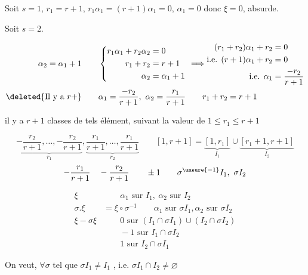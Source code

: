 Soit  $s=1$,  $r_1=r+1$, $r_1\alpha_1=(r+1)\alpha_1=0$, $\alpha_1=0$  donc $\xi=0$, absurde.

Soit $s=2$.

\[
\begin{aligned}
\alpha_2=\alpha_1+1\qquad&
\left\{\begin{aligned}
r_1\alpha_1+r_2\alpha_2&=0\\r_1+r_2&=r+1\\\alpha_2&=\alpha_1+1
\end{aligned}\right.
\ \Longrightarrow
\begin{aligned}
(r_1+r_2)\alpha_1+r_2&=0\\
\text{i.e. }(r+1)\alpha_1+r_2&=0\\
\text{i.e. }\alpha_1&=\frac{-r_2}{r+1}
\end{aligned}\\
\deleted{\text{Il y a }r+}\qquad&
\alpha_1=\frac{-r_2}{r+1},\ \alpha_2=\frac{r_1}{r+1}\qquad r_1+r_2=r+1
\end{aligned}
\]

il y a $r+1$ classes de tels élément, suivant la valeur de $1\leq r_1\leq r+1$


\[
\underbrace{-\frac{r_2}{r+1},\ldots,-\frac{r_2}{r+1}}_{r_1},
\underbrace{\frac{r_1}{r+1},\ldots,\frac{r_1}{r+1}}_{r_2}
\qquad
[1,r+1]=\underbrace{[1,r_1]}_{I_1}\cup\underbrace{[r_1+1,r+1]}_{I_2}
\]
\[-\frac{r_1}{r+1}\quad-\frac{r_2}{r+1}\qquad\pm1\qquad \sigma^{\unsure{-1}}I_1,\ \sigma I_2\]

\[
\begin{aligned}
\xi&\qquad\alpha_1\text{ sur }I_1,\ \alpha_2\text{ sur }I_2\\
\sigma.\xi&=\xi\circ\sigma^{-1}\qquad\alpha_1\text{ sur }\sigma I_1,\alpha_2\text{ sur }\sigma I_2\\
\xi-\sigma\xi&\qquad 0\text{ sur }(I_1\cap\sigma I_1)\cup(I_2\cap\sigma I_2)\\
&\qquad-1\text{ sur }I_1\cap\sigma I_2\\
&\qquad 1\text{ sur }I_2\cap\sigma I_1
\end{aligned}
\]

On veut, $\forall\sigma$ tel que $\sigma I_1\ne I_1$ ,   i.e. $\sigma I_1\cap I_2\ne\varnothing$


